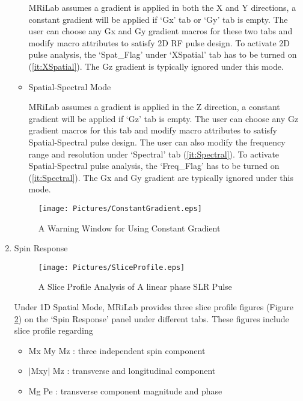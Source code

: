 \documentclass{book}%
\begin{document}
\begin{enumerate}
\begin{itemize}
MRiLab assumes a gradient is applied in both the X and Y directions, a constant gradient will be applied if `Gx' tab or `Gy' tab is empty. The user can choose any Gx and Gy gradient macros for these two tabs and modify macro attributes to satisfy 2D RF pulse design. To activate 2D pulse analysis, the `Spat\_Flag' under `XSpatial' tab has to be turned on (\ref{it:XSpatial}). The Gz gradient is typically ignored under this mode.

	\item Spatial-Spectral Mode
	
MRiLab assumes a gradient is applied in the Z direction, a constant gradient will be applied if `Gz' tab is empty. The user can choose any Gz gradient macros for this tab and modify macro attributes to satisfy Spatial-Spectral pulse design. The user can also modify the frequency range and resolution under `Spectral' tab (\ref{it:Spectral}). To activate Spatial-Spectral pulse analysis, the `Freq\_Flag' has to be turned on (\ref{it:Spectral}). The Gx and Gy gradient are typically ignored under this mode.

\end{itemize}

	\begin{figure}[htbp]
	\centering
		\texttt{[image: Pictures/ConstantGradient.eps]}
	\caption{A Warning Window for Using Constant Gradient}
	\label{fig:ConstantGradient}
\end{figure}

	\item Spin Response \\

\begin{figure}[htbp]
	\centering
		\texttt{[image: Pictures/SliceProfile.eps]}
	\caption{A Slice Profile Analysis of A linear phase SLR Pulse}
	\label{fig:SliceProfile}
\end{figure}

Under 1D Spatial Mode, MRiLab provides three slice profile figures (Figure \ref{fig:SliceProfile}) on the `Spin Response' panel under different tabs. These figures include slice profile regarding 

\begin{itemize}
	\item Mx My Mz : three independent spin component
	\item $\vert$Mxy$\vert$ Mz : transverse and longitudinal component
	\item Mg Pe : transverse component magnitude and phase
\end{itemize}


\end{enumerate}
\end{document}
